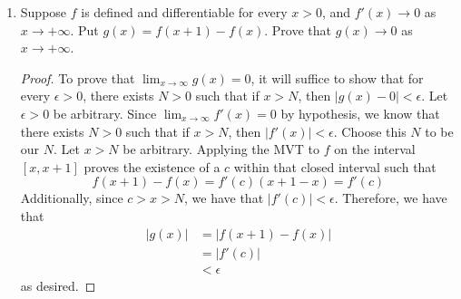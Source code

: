 \documentclass[../psets.tex]{subfiles}
\begin{document}
\begin{enumerate}[label={\textbf{\arabic*.}}]
\begin{proof}
        We have that $f(0)=0$ (by direct substitution) and $f(1)=0$ (by the constraint on the coefficients). Thus, since $f$ is continuous on $[0,1]$ and differentiable on $(0,1)$ (as a polynomial), we have by the MVT that there exists $x\in(0,1)$ such that
        \begin{align*}
            f(1)-f(0) &= (1-0)f'(x)\\
            f'(x) &= 0\\
            C_0+C_1x+\cdots+C_{n-1}x^{n-1}+C_nx^n &= 0
        \end{align*}
        as desired.
    \end{proof}
    \item Suppose $f$ is defined and differentiable for every $x>0$, and $f'(x)\to 0$ as $x\to+\infty$. Put $g(x)=f(x+1)-f(x)$. Prove that $g(x)\to 0$ as $x\to+\infty$.
    \begin{proof}
        To prove that $\lim_{x\to\infty}g(x)=0$, it will suffice to show that for every $\epsilon>0$, there exists $N>0$ such that if $x>N$, then $|g(x)-0|<\epsilon$. Let $\epsilon>0$ be arbitrary. Since $\lim_{x\to\infty}f'(x)=0$ by hypothesis, we know that there exists $N>0$ such that if $x>N$, then $|f'(x)|<\epsilon$. Choose this $N$ to be our $N$. Let $x>N$ be arbitrary. Applying the MVT to $f$ on the interval $[x,x+1]$ proves the existence of a $c$ within that closed interval such that
        \begin{equation*}
            f(x+1)-f(x) = f'(c)(x+1-x) = f'(c)
        \end{equation*}
        Additionally, since $c>x>N$, we have that $|f'(c)|<\epsilon$. Therefore, we have that
        \begin{align*}
            |g(x)| &= |f(x+1)-f(x)|\\
            &= |f'(c)|\\
            &< \epsilon
        \end{align*}
        as desired.
    \end{proof}
\end{enumerate}
\end{document}

